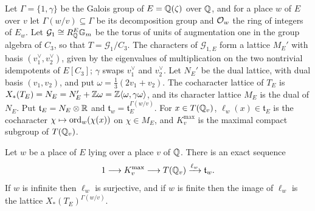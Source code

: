 \begin{proposition}

\label{prop:basicfacts}


\leanok

Let $\Gamma=\{1,\gamma\}$ be the Galois group of $E=\mathbb{Q}(\zeta)$ over $\mathbb{Q}$, and for a place $w$ of $E$ over $v$ let $\Gamma(w/v)\subseteq\Gamma$ be its decomposition group and $\mathcal{O}_w$ the ring of integers of $E_w$. Let $\mathcal G_1\cong R^E_{\mathbb{Q}}\mathbb{G}_m$ be the torus of units of augmentation one in the group algebra of $C_3$, so that $T=\mathcal G_1/C_3$. The characters of $\mathcal G_{1,E}$ form a lattice $M_E'$ with basis $(v_1^\vee,v_2^\vee)$, given by the eigenvalues of multiplication on the two nontrivial idempotents of $E[C_3]$; $\gamma$ swaps $v_1^\vee$ and $v_2^\vee$. Let $N_E'$ be the dual lattice, with dual basis $(v_1,v_2)$, and put $\omega=\tfrac13(2v_1+v_2)$. The cocharacter lattice of $T_E$ is $X_\ast(T_E)=N_E=N_E'+\mathbb{Z}\omega=\mathbb{Z}\langle\omega,\gamma\omega\rangle$, and its character lattice $M_E$ is the dual of $N_E$. Put $\mathfrak t_E=N_E\otimes\mathbb{R}$ and $\mathfrak t_w=\mathfrak t_E^{\Gamma(w/v)}$. For $x\in T(\mathbb{Q}_v)$, $\ell_w(x)\in\mathfrak t_E$ is the cocharacter $\chi\mapsto\mathrm{ord}_w(\chi(x))$ on $\chi\in M_E$, and $K_v^{\mathrm{max}}$ is the maximal compact subgroup of $T(\mathbb{Q}_v)$.

 Let $w$ be a place of $E$ lying over a place $v$ of $\mathbb{Q}$. There is an exact sequence \begin{equation*} 1 \longrightarrow K_v^{\mathrm{max}} \longrightarrow T(\mathbb{Q}_v) \xrightarrow{\ell_w} \mathfrak t_w. \end{equation*} If $w$ is infinite then $\ell_w$ is surjective, and if $w$ is finite then the image of $\ell_w$ is the lattice $X_\ast(T_{E})^{\Gamma(w/v)}$. 

\end{proposition}

